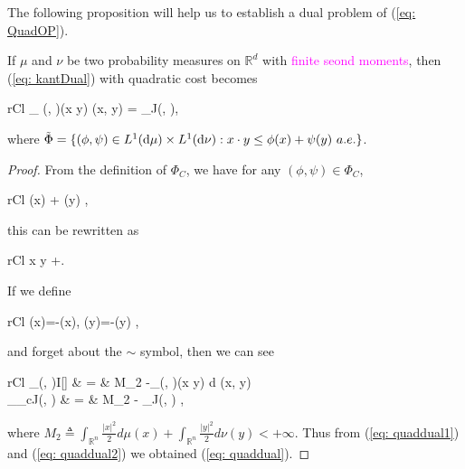 The following proposition will help us to establish a dual problem of (\ref{eq: QuadOP}).
\begin{proposition}
	If $\mu$ and $\nu$ be two probability measures on $\mathbb{R}^d$ with \textcolor{magenta}{finite seond moments}, then (\ref{eq: kantDual}) with quadratic cost becomes
	\begin{IEEEeqnarray}{rCl}
		\sup_{ \Pi(\mu, \nu)}\int (x \cdot y) \md \pi(x, y) = \inf_{\tilde{\Phi}}J(\phi, \psi), \label{eq: quaddual}
	\end{IEEEeqnarray}
where $\tilde{\Phi} = \{(\phi, \psi) \in L^1(\mathrm{d}\mu) \times L^1(\mathrm{d}\nu): x \cdot y \leq \phi(x) + \psi(y) \ a.e. \}$.
\end{proposition}
\begin{proof}
	From the definition of $\Phi_C$, we have for any $(\phi, \psi) \in \Phi_C$,
	\begin{IEEEeqnarray}{rCl}
		\phi(x) + \psi(y) \leq {}, \nonumber
	\end{IEEEeqnarray}
	this can be rewritten as
	\begin{IEEEeqnarray}{rCl}
		x \cdot y \leq{}+ \nonumber.
	\end{IEEEeqnarray}
	If we define
	\begin{IEEEeqnarray}{rCl}
		\widetilde{\phi}(x)=-\phi(x), \quad \widetilde{\psi}(y)=-\psi(y) \nonumber,
	\end{IEEEeqnarray}
	and forget about the $\sim$ symbol, then we can see
	\begin{IEEEeqnarray}{rCl}
		\inf_{\Pi(\mu, \nu)}I[\pi] & = & M_{2} -\sup_{\Pi(\mu, \nu)}\int (x \cdot y) d \pi(x, y) \label{eq: quaddual1} \\
		\sup_{\Phi_c}J(\phi, \psi) & = & M_2 - \inf_{\tilde{\Phi}}J(\phi, \psi) \label{eq: quaddual2},
	\end{IEEEeqnarray}
	where $M_{2}\triangleq\int_{\mathbb{R}^{n}} \frac{|x|^{2}}{2} d \mu(x)+\int_{\mathbb{R}^{n}} \frac{|y|^{2}}{2} d \nu(y)<+\infty$. Thus from (\ref{eq: quaddual1}) and (\ref{eq: quaddual2}) we obtained (\ref{eq: quaddual}).
\end{proof}


